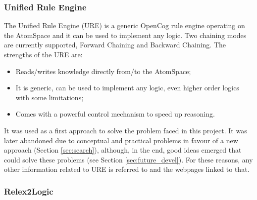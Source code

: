 \subsubsection{Unified Rule Engine}\label{sec:ure}

The Unified Rule Engine (URE) is a generic OpenCog rule engine operating on the AtomSpace and it can be used to implement any logic. 
Two chaining modes are currently supported, Forward Chaining and Backward Chaining. 
The strengths of the URE are:
\begin{itemize}
	\item Reads/writes knowledge directly from/to the AtomSpace;
	\item It is generic, can be used to implement any logic, even higher order logics with some limitations;
	\item Comes with a powerful control mechanism to speed up reasoning.
\end{itemize}

It was used as a first approach to solve the problem faced in this project. It was later abandoned due to conceptual and practical problems in favour of a new approach (Section \ref{sec:search}), although, in the end, good ideas emerged that could solve these problems (see Section \ref{sec:future_devel}). 
For these reasons, any other information related to URE is referred to \cite{geisweiller_2019} and the webpages linked to that.

\subsubsection{Relex2Logic}\label{sec:r2l}

